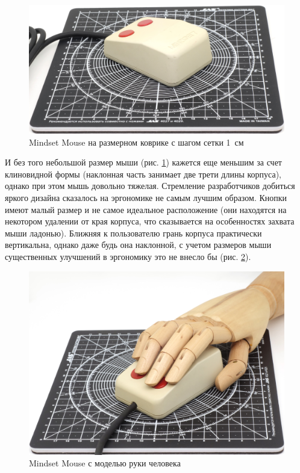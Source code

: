 \documentclass[11pt, a4paper]{article}
\begin{document}
\begin{figure}[h]
    \centering
    \includegraphics[scale=0.5]{1984_mindset_mouse/size_15.jpg}
    \caption{Mindset Mouse на размерном коврике с шагом сетки 1~см}
    \label{fig:MindsetMouseSize}
\end{figure}

И без того небольшой размер мыши (рис. \ref{fig:MindsetMouseSize}) кажется еще меньшим за счет клиновидной формы (наклонная часть занимает две трети длины корпуса), однако при этом мышь довольно тяжелая. Стремление разработчиков добиться яркого дизайна сказалось на эргономике не самым лучшим образом. Кнопки имеют малый размер и не самое идеальное расположение (они находятся на некотором удалении от края корпуса, что сказывается на особенностях захвата мыши ладонью). Ближняя к пользователю грань корпуса практически вертикальна, однако даже будь она наклонной, с учетом размеров мыши существенных улучшений в эргономику это не внесло бы (рис. \ref{fig:MindsetMouseHand}).

\begin{figure}[h]
    \centering
    \includegraphics[scale=0.5]{1984_mindset_mouse/hand_30.jpg}
    \caption{Mindset Mouse с моделью руки человека}
    \label{fig:MindsetMouseHand}
\end{figure}
\end{document}
